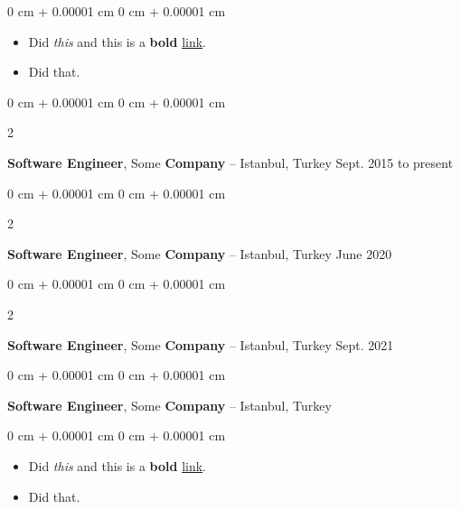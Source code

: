 \documentclass[10pt, letterpaper]{article}
\newenvironment{highlights}{
    \begin{itemize}[
        topsep=0.10 cm,
        parsep=0.10 cm,
        partopsep=0pt,
        itemsep=0pt,
        leftmargin=0 cm + 10pt
    ]
}{
    \end{itemize}
        
    \vspace{-0.10cm}
} %
\newenvironment{onecolentry}{
    \begin{adjustwidth}{
        0 cm + 0.00001 cm
    }{
        0 cm + 0.00001 cm
    }
}{
    \end{adjustwidth}
} %
\newenvironment{twocolentry}[2][]{
    \onecolentry
    \def\secondColumn{#2}
    \setcolumnwidth{\fill, 4.1 cm}
    \begin{paracol}{2}
}{
    \switchcolumn \raggedleft \secondColumn
    \end{paracol}
    \endonecolentry
} %
\begin{document}
        \vspace{0.10 cm}
        \begin{onecolentry}
            \begin{highlights}
                \item Did \textit{this} and this is a \textbf{bold} \href{https://example.com}{link}.
                \item Did that.
            \end{highlights}
        \end{onecolentry}


        \vspace{0.15 cm}

        \begin{twocolentry}{
            Sept. 2015 to present
        }
            \textbf{Software Engineer}, Some \textbf{Company} -- Istanbul, Turkey\end{twocolentry}

        \vspace{0.10 cm}


        \vspace{0.15 cm}

        \begin{twocolentry}{
            June 2020
        }
            \textbf{Software Engineer}, Some \textbf{Company} -- Istanbul, Turkey\end{twocolentry}

        \vspace{0.10 cm}


        \vspace{0.15 cm}

        \begin{twocolentry}{
            Sept. 2021
        }
            \textbf{Software Engineer}, Some \textbf{Company} -- Istanbul, Turkey\end{twocolentry}

        \vspace{0.10 cm}


        \vspace{0.15 cm}

        \begin{onecolentry}
            \textbf{Software Engineer}, Some \textbf{Company} -- Istanbul, Turkey\end{onecolentry}

        \vspace{0.10 cm}
        \begin{onecolentry}
            \begin{highlights}
                \item Did \textit{this} and this is a \textbf{bold} \href{https://example.com}{link}.
                \item Did that.
            \end{highlights}
        \end{onecolentry}
\end{document}
